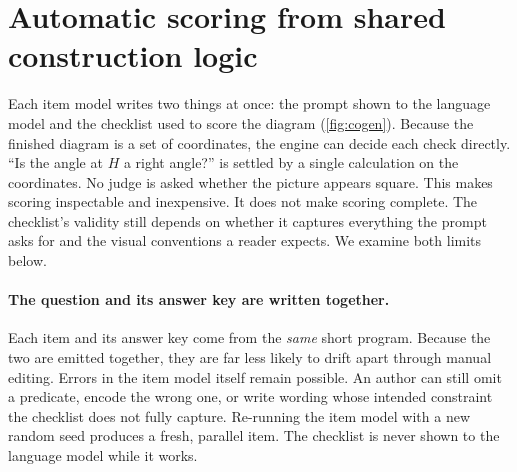\section{Automatic scoring from shared construction logic}
\label{sec:scoring}

Each item model writes two things at once: the prompt shown to the language model and the checklist used to score the diagram (\cref{fig:cogen}). Because the finished diagram is a set of coordinates, the engine can decide each check directly. ``Is the angle at $H$ a right angle?'' is settled by a single calculation on the coordinates. No judge is asked whether the picture appears square. This makes scoring inspectable and inexpensive. It does not make scoring complete. The checklist's validity still depends on whether it captures everything the prompt asks for and the visual conventions a reader expects. We examine both limits below.

\paragraph{The question and its answer key are written together.}
Each item and its answer key come from the \emph{same} short program. Because the two are emitted together, they are far less likely to drift apart through manual editing. Errors in the item model itself remain possible. An author can still omit a predicate, encode the wrong one, or write wording whose intended constraint the checklist does not fully capture. Re-running the item model with a new random seed produces a fresh, parallel item. The checklist is never shown to the language model while it works.

